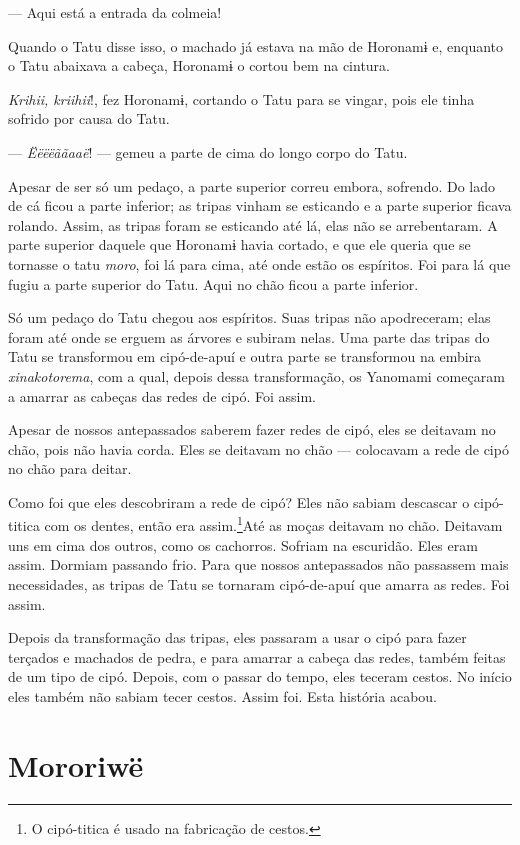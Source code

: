 --- Aqui está a entrada da colmeia! 

Quando o Tatu disse isso, o machado já estava na mão de Horonamɨ e,
enquanto o Tatu abaixava a cabeça, Horonamɨ o cortou bem na cintura. 

\textit{Krihii, kriihii}!, fez Horonamɨ, cortando o Tatu para se vingar, pois
ele tinha sofrido por causa do Tatu. 

--- \textit{Ëëëëããaaë}! --- gemeu a parte de cima do longo corpo do Tatu. 

Apesar de ser só um pedaço, a parte superior correu embora, sofrendo. Do
lado de cá ficou a parte inferior; as tripas vinham se esticando e a
parte superior ficava rolando. Assim, as tripas foram se esticando até
lá, elas não se arrebentaram. A parte superior daquele que Horonamɨ
havia cortado, e que ele queria que se tornasse o tatu \textit{moro}, foi
lá para cima, até onde estão os espíritos. Foi para lá que fugiu a parte
superior do Tatu. Aqui no chão ficou a parte inferior. 

Só um pedaço do Tatu chegou aos espíritos. Suas tripas não apodreceram;
elas foram até onde se erguem as árvores e subiram nelas. Uma parte das
tripas do Tatu se transformou em cipó-de-apuí e outra parte se
transformou na embira \textit{xinakotorema}, com a qual, depois dessa
transformação, os Yanomami começaram a amarrar as cabeças das redes de
cipó. Foi assim.

Apesar de nossos antepassados saberem fazer redes de cipó, eles se
deitavam no chão, pois não havia corda. Eles se deitavam no chão ---
colocavam a rede de cipó no chão para deitar. 

Como foi que eles descobriram a rede de cipó? Eles não sabiam descascar
o cipó-titica com os dentes, então era assim.\footnote{O cipó-titica é usado na fabricação de cestos.}Até as
moças deitavam no chão. Deitavam uns em cima dos outros, como os
cachorros. Sofriam na escuridão. Eles eram assim. Dormiam passando frio.
Para que nossos antepassados não passassem mais necessidades, as tripas
de Tatu se tornaram cipó-de-apuí que amarra as redes. Foi assim. 

Depois da transformação das tripas, eles passaram a usar o cipó para
fazer terçados e machados de pedra, e para amarrar a cabeça das redes,
também feitas de um tipo de cipó. Depois, com o passar do tempo, eles
teceram cestos. No início eles também não sabiam tecer cestos. Assim
foi. Esta história acabou.

\chapter{Mororiwë}

